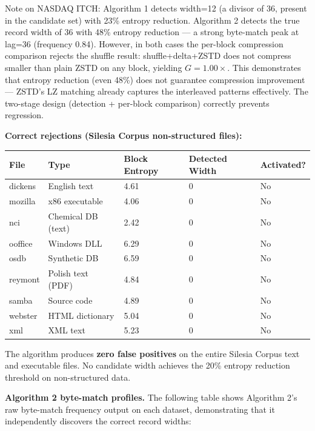 \documentclass[
  11pt,
  letterpaper,
]{article}
\makeatletter
\renewcommand{\_}{\bpd@origunderscore\allowbreak}
\makeatother
\begin{document}
Note on NAS\-DAQ ITCH: Algorithm 1 detects width=12 (a divisor of 36,
present in the candidate set) with 23\% entropy reduction. Algorithm 2
detects the true record width of 36 with 48\% entropy reduction --- a
strong byte-match peak at lag=36 (frequency 0.84). However, in both
cases the per-block compression comparison rejects the shuffle result:
shuffle+delta+ZSTD does not compress smaller than plain ZSTD on any
block, yielding \(G = 1.00\times\). This demonstrates that entropy
reduction (even 48\%) does not guarantee compression improvement ---
ZSTD's LZ matching already captures the interleaved patterns
effectively. The two-stage design (detection + per-block comparison)
correctly prevents regression.

\textbf{Correct rejections (Silesia Corpus non-structured files):}

\begin{longtable}[]{@{}lllll@{}}
\toprule\noalign{}
File & Type & Block Entropy & Detected Width & Activated? \\
\midrule\noalign{}
\endhead
\bottomrule\noalign{}
\endlastfoot
dickens & English text & 4.61 & 0 & No \\
mozilla & x86 executable & 4.06 & 0 & No \\
nci & Chemical DB (text) & 2.42 & 0 & No \\
ooffice & Windows DLL & 6.29 & 0 & No \\
osdb & Synthetic DB & 6.59 & 0 & No \\
reymont & Polish text (PDF) & 4.84 & 0 & No \\
samba & Source code & 4.89 & 0 & No \\
webster & HTML dictionary & 5.04 & 0 & No \\
xml & XML text & 5.23 & 0 & No \\
\end{longtable}

The algorithm produces \textbf{zero false positives} on the entire
Silesia Corpus text and executable files. No candidate width achieves
the 20\% entropy reduction threshold on non-structured data.

\textbf{Algorithm 2 byte-match profiles.} The following table shows
Algorithm 2's raw byte-match frequency output on each dataset,
demonstrating that it independently discovers the correct record widths:
\end{document}
